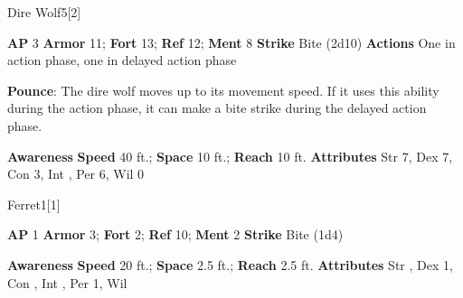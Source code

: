 \begin{monsection}{Dire Wolf}{5}[2]
\vspace{-1em}\vspace{-1em}
\begin{spellcontent}
\begin{spelltargetinginfo}
{\textbf{AP} 3}
\pari \textbf{Armor} 11;
\textbf{Fort} 13;
\textbf{Ref} 12;
\textbf{Ment} 8
\pari \textbf{Strike} Bite  (2d10)
\pari \textbf{Actions} One in action phase, one in delayed action phase
\end{spelltargetinginfo}
\begin{spelleffects}
\pari
\textbf{Pounce}:
The dire wolf moves up to its movement speed.
If it uses this ability during the action phase, it can make a bite strike during the delayed action phase.
\end{spelleffects}
\end{spellcontent}
\begin{spellsubcontent}
\begin{spellfooter}
\pari \textbf{Awareness} 
\pari \textbf{Speed} 40 ft.;
\textbf{Space} 10 ft.;
\textbf{Reach} 10 ft.
\pari \textbf{Attributes}
Str 7,
Dex 7,
Con 3,
Int ,
Per 6,
Wil 0
\end{spellfooter}
\end{spellsubcontent}
\end{monsection}
\begin{monsection}{Ferret}{1}[1]
\vspace{-1em}\vspace{-1em}
\begin{spellcontent}
\begin{spelltargetinginfo}
{\textbf{AP} 1}
\pari \textbf{Armor} 3;
\textbf{Fort} 2;
\textbf{Ref} 10;
\textbf{Ment} 2
\pari \textbf{Strike} Bite  (1d4)
\end{spelltargetinginfo}
\end{spellcontent}
\begin{spellsubcontent}
\begin{spellfooter}
\pari \textbf{Awareness} 
\pari \textbf{Speed} 20 ft.;
\textbf{Space} 2.5 ft.;
\textbf{Reach} 2.5 ft.
\pari \textbf{Attributes}
Str ,
Dex 1,
Con ,
Int ,
Per 1,
Wil 
\end{spellfooter}
\end{spellsubcontent}
\end{monsection}
